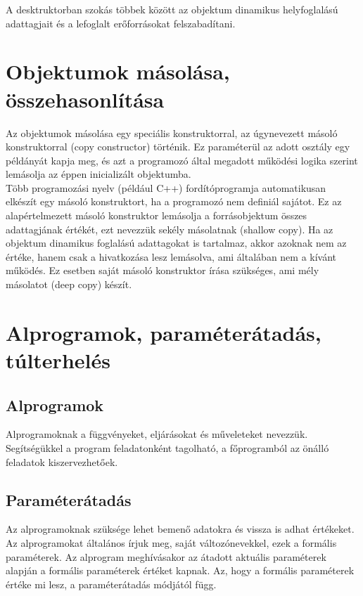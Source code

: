 \documentclass[12pt,margin=0px]{article}
\begin{document}
	\noindent A desktruktorban szokás többek között az objektum dinamikus helyfoglalású adattagjait és a lefoglalt erőforrásokat felszabadítani.
	
	\section{Objektumok másolása, összehasonlítása}
	
    Az objektumok másolása egy speciális konstruktorral, az úgynevezett másoló konstruktorral (copy constructor) történik. Ez paraméterül az adott osztály egy példányát kapja meg, és azt a programozó által megadott működési logika szerint lemásolja az éppen inicializált objektumba.\\
	
    \noindent Több programozási nyelv (például C++) fordítóprogramja automatikusan elkészít egy másoló konstruktort, ha a programozó nem definiál sajátot. Ez az alapértelmezett másoló konstruktor lemásolja a forrásobjektum összes adattagjának értékét, ezt nevezzük sekély másolatnak (shallow copy). Ha az objektum dinamikus foglalású adattagokat is tartalmaz, akkor azoknak nem az értéke, hanem csak a hivatkozása lesz lemásolva, ami általában nem a kívánt működés. Ez esetben saját másoló konstruktor írása szükséges, ami mély másolatot (deep copy) készít.
	
	\section{Alprogramok, paraméterátadás, túlterhelés}
	
	\subsection{Alprogramok}
	
    Alprogramoknak a függvényeket, eljárásokat és műveleteket nevezzük. Segítségükkel a program feladatonként tagolható, a főprogramból az önálló feladatok kiszervezhetőek.
	
	\subsection{Paraméterátadás}
	
    Az alprogramoknak szüksége lehet bemenő adatokra és vissza is adhat értékeket. Az alprogramokat általános írjuk meg, saját változónevekkel, ezek a formális paraméterek. Az alprogram meghívásakor az átadott aktuális paraméterek alapján a formális paraméterek értéket kapnak. Az, hogy a formális paraméterek értéke mi lesz, a paraméterátadás módjától függ.
	
\end{document}
